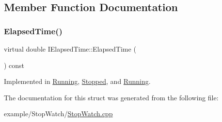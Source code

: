 \subsection{Member Function Documentation}
\mbox{\label{struct_i_elapsed_time_a11995710009caacf4343d6d0f79da4ce}} 
\subsubsection{\texorpdfstring{Elapsed\+Time()}{ElapsedTime()}}
{\footnotesize\ttfamily virtual double I\+Elapsed\+Time\+::\+Elapsed\+Time (\begin{DoxyParamCaption}{ }\end{DoxyParamCaption}) const\hspace{0.3cm}{\ttfamily [pure virtual]}}



Implemented in \mbox{\hyperlink{struct_running_a5320a8463f61e5ab96008bc218bb9f68}{Running}}, \mbox{\hyperlink{struct_stopped_ae9dec429ddbf79320898e3bdd67580e8}{Stopped}}, and \mbox{\hyperlink{struct_running_ac9d1d116f030428827757e3a5289d94a}{Running}}.



The documentation for this struct was generated from the following file\+:\begin{DoxyCompactItemize}
\item 
example/\+Stop\+Watch/\mbox{\hyperlink{_stop_watch_8cpp}{Stop\+Watch.\+cpp}}\end{DoxyCompactItemize}
